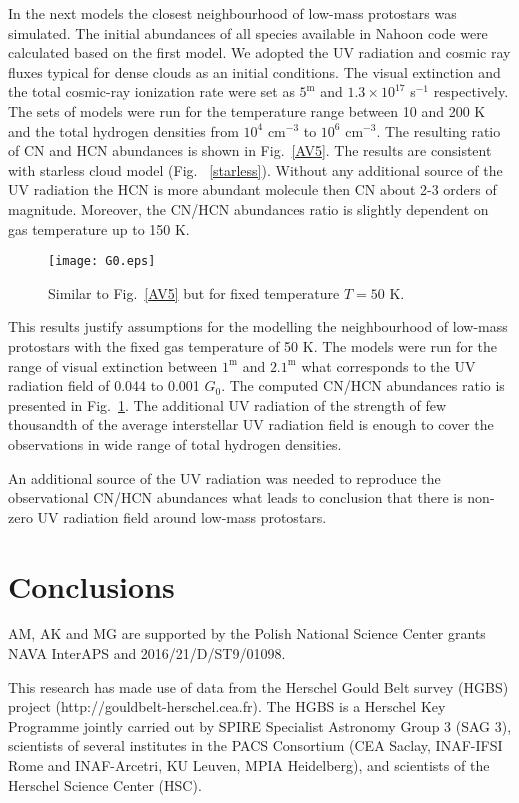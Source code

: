 \documentclass{aa}
\begin{document}
In the next models the closest neighbourhood of low-mass protostars was simulated. The initial abundances of all species available in Nahoon code were calculated based on the first model. We adopted the UV radiation and cosmic ray fluxes typical for dense clouds as an initial conditions. The visual extinction and the total cosmic-ray ionization rate were set as $5^{\mathrm{m}}$ and $1.3\times 10^{17}$ s$^{-1}$ respectively. The sets of models were run for the temperature range between 10 and 200 K and the total hydrogen densities from $10^4$ cm$^{-3}$ to $10^6$ cm$^{-3}$. The resulting ratio of CN and HCN abundances is shown in Fig.~\ref{AV5}. The results are consistent with starless cloud model (Fig. ~\ref{starless}). Without any additional source of the UV radiation the HCN is more abundant molecule then CN about 2-3 orders of magnitude. Moreover, the CN/HCN abundances ratio is slightly dependent on gas temperature up to 150 K. 

\begin{figure}
   \centering
   \texttt{[image: G0.eps]}
      \caption{Similar to  Fig.~\ref{AV5} but for fixed temperature $T = 50$ K.}
         \label{G0}
   \end{figure}

This results justify assumptions for the modelling the neighbourhood of low-mass protostars with the fixed gas temperature of 50 K. The models were run for the range of visual extinction between $1^{\mathrm{m}}$ and $2.1^{\mathrm{m}}$ what corresponds to the UV radiation field of 0.044 to 0.001 $G_0$. The computed CN/HCN abundances ratio is presented in Fig.~\ref{G0}. The additional UV radiation of the strength of few thousandth of the average interstellar UV radiation field is enough to cover the observations in wide range of total hydrogen densities. 

An additional source of the UV radiation was needed to reproduce the observational CN/HCN abundances what leads to conclusion that there is non-zero UV radiation field around low-mass protostars. 

\section{Conclusions}

\begin{acknowledgements}
AM, AK and MG are supported by the Polish National Science Center grants NAVA InterAPS and 2016/21/D/ST9/01098. 

This research has made use of data from the Herschel Gould Belt survey (HGBS) project (http://gouldbelt-herschel.cea.fr). The HGBS is a Herschel Key Programme jointly carried out by SPIRE Specialist Astronomy Group 3 (SAG 3), scientists of several institutes in the PACS Consortium (CEA Saclay, INAF-IFSI Rome and INAF-Arcetri, KU Leuven, MPIA Heidelberg), and scientists of the Herschel Science Center (HSC).
\end{acknowledgements}
\end{document}

